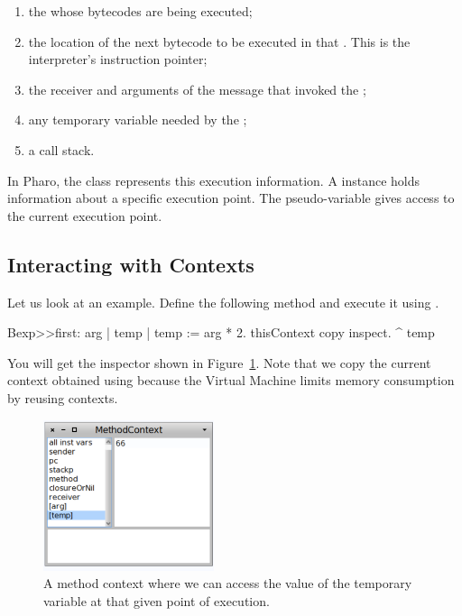 \documentclass[a4paper,10pt,twoside]{book}
\begin{document}
\begin{enumerate}
\item the  whose bytecodes are being executed;
\item the location of the next bytecode to be executed in that
. This is the interpreter's instruction pointer;
\item the receiver and arguments of the message that invoked the
;
\item any temporary variable needed by the ;
\item a call stack.
\end{enumerate}

In Pharo, the class  represents this execution information. A  instance holds information about a specific execution point.  The pseudo-variable  gives access to the current execution point.

\subsection{Interacting with Contexts}

Let us look at an example. Define the following method and execute it using .

\begin{code}{}
Bexp>>first: arg
	| temp |
	temp := arg * 2.
	thisContext copy inspect.
	^ temp
\end{code}

You will get the inspector shown in Figure~\ref{oneContext}. Note that we copy the current context obtained using  because the Virtual Machine limits memory consumption by reusing contexts.

\begin{figure}
\begin{center}\includegraphics[width=5cm]{OneContext}
\caption{A method context where we can access the value of the temporary variable  at that given point of execution.\label{oneContext}}
\end{center}
\end{figure}
\end{document}
